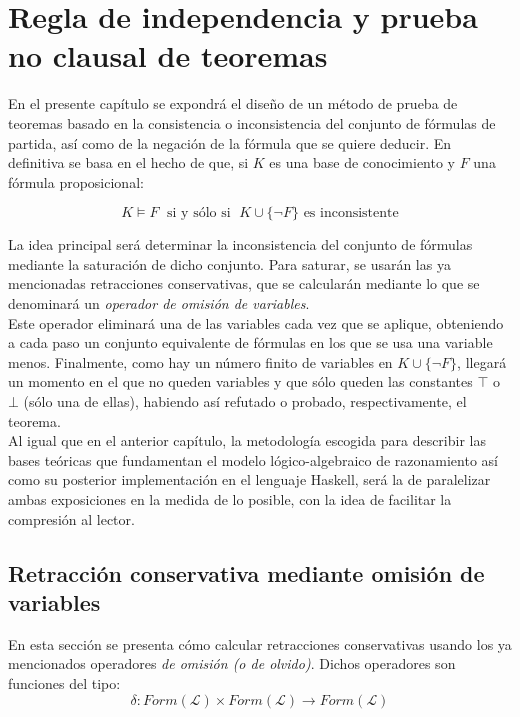 \chapter{Regla de independencia y prueba no clausal de teoremas}

En el presente capítulo se expondrá el diseño de un método de prueba de teoremas basado en la consistencia o inconsistencia del conjunto de fórmulas de partida, así como de la negación de la fórmula que se quiere deducir. En definitiva se basa en el hecho de que, si $K$ es una base de conocimiento y $F$ una fórmula proposicional:

$$K\vDash F \;\text{ si y sólo si }\; K \cup \{ \neg F \} \text{ es inconsistente}$$

La idea principal será determinar la inconsistencia del conjunto de fórmulas mediante la saturación de dicho conjunto. Para saturar, se usarán las ya mencionadas retracciones conservativas,  que se calcularán mediante lo que se denominará un \textit{operador de omisión de variables}. \\

Este operador eliminará una de las variables cada vez que se aplique, obteniendo a cada paso un conjunto equivalente de fórmulas en los que se usa una variable menos. Finalmente, como hay un número finito de variables en $K \cup \{ \neg F \} $, llegará un momento en el que no queden variables y que sólo queden las constantes $\top$ o $\bot$ (sólo una de ellas), habiendo así refutado o probado, respectivamente, el teorema.\\

Al igual que en el anterior capítulo, la metodología escogida para describir las bases teóricas que fundamentan el modelo lógico-algebraico de razonamiento así como su posterior implementación en el lenguaje Haskell, será la de paralelizar ambas exposiciones en la medida de lo posible, con la idea de facilitar la compresión al lector.


\section{Retracción conservativa mediante omisión de variables}
En esta sección se presenta cómo calcular retracciones conservativas usando los ya mencionados operadores \textit{de omisión (o de olvido)}. Dichos operadores son funciones del tipo:
$$\delta : Form(\mathcal{L}) \times Form(\mathcal{L}) \longrightarrow Form(\mathcal{L}) $$

